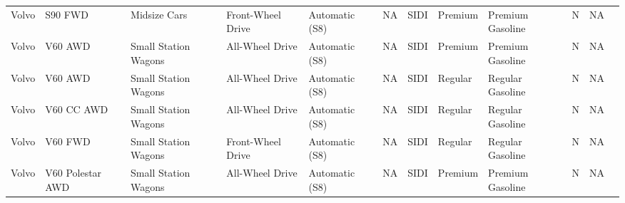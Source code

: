 \documentclass[11pt]{article}
\begin{document}
\begin{tabular}{r|lllllllllll}
	 Volvo                              & S90 FWD                            & Midsize Cars                       & Front-Wheel Drive                  & Automatic (S8)                     & NA                                 & SIDI                               & Premium                            & Premium Gasoline                   & N                                  & NA                                \\
	 Volvo                              & V60 AWD                            & Small Station Wagons               & All-Wheel Drive                    & Automatic (S8)                     & NA                                 & SIDI                               & Premium                            & Premium Gasoline                   & N                                  & NA                                \\
	 Volvo                              & V60 AWD                            & Small Station Wagons               & All-Wheel Drive                    & Automatic (S8)                     & NA                                 & SIDI                               & Regular                            & Regular Gasoline                   & N                                  & NA                                \\
	 Volvo                              & V60 CC AWD                         & Small Station Wagons               & All-Wheel Drive                    & Automatic (S8)                     & NA                                 & SIDI                               & Regular                            & Regular Gasoline                   & N                                  & NA                                \\
	 Volvo                              & V60 FWD                            & Small Station Wagons               & Front-Wheel Drive                  & Automatic (S8)                     & NA                                 & SIDI                               & Regular                            & Regular Gasoline                   & N                                  & NA                                \\
	 Volvo                              & V60 Polestar AWD                   & Small Station Wagons               & All-Wheel Drive                    & Automatic (S8)                     & NA                                 & SIDI                               & Premium                            & Premium Gasoline                   & N                                  & NA                                \\

\end{tabular}
\end{document}
